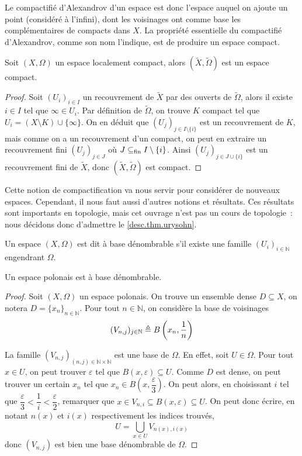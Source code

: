 Le compactifié d'Alexandrov d'un espace est donc l'espace auquel on ajoute un
point (considéré à l'infini), dont les voisinages ont comme base les
complémentaires de compacts dans $X$. La propriété essentielle du compactifié
d'Alexandrov, comme son nom l'indique, est de produire un espace compact.

\begin{proposition}
  Soit $(X,\Omega)$ un espace localement compact, alors
  $(\tilde X,\tilde\Omega)$ est un espace compact.
\end{proposition}

\begin{proof}
  Soit $(U_i)_{i\in I}$ un recouvrement de $\tilde X$ par des ouverts de
  $\tilde\Omega$, alors il existe $i\in I$ tel que $\infty \in U_i$. Par
  définition de $\tilde \Omega$, on trouve $K$ compact tel que
  $U_i = (X\setminus K)\cup\{\infty\}$. On en déduit que
  $(U_j)_{j\in I\setminus\{i\}}$ est un recouvrement de $K$, mais comme
  on a un recouvrement d'un compact, on peut en extraire un recouvrement
  fini $(U_j)_{j\in J}$ où $J\subseteq_{\mathrm{fin}} I\setminus\{i\}$. Ainsi
  $(U_j)_{j\in J\cup \{i\}}$ est un recouvrement fini de $\tilde X$, donc
  $(\tilde X,\tilde\Omega)$ est compact.
\end{proof}

Cette notion de compactification va nous servir pour considérer de nouveaux
espaces. Cependant, il nous faut aussi d'autres notions et résultats. Ces
résultats sont importants en topologie, mais cet ouvrage n'est pas un cours de
topologie~: nous décidons donc d'admettre le \cref{desc.thm.urysohn}.

\begin{definition}
  Un espace $(X,\Omega)$ est dit à base dénombrable s'il existe une famille
  $(U_i)_{i\in\mathbb N}$ engendrant $\Omega$.
\end{definition}

\begin{proposition}\label{prop.base.denomb}
  Un espace polonais est à base dénombrable.
\end{proposition}

\begin{proof}
  Soit $(X,\Omega)$ un espace polonais. On trouve un ensemble dense
  $D\subseteq X$, on notera $D = \{x_n\}_{n\in\mathbb N}$. Pour tout
  $n\in\mathbb N$, on considère la base de voisinages
  \[(V_{n,j})_{j\in \mathbb N} \triangleq B\left(x_n,\frac{1}{n}\right)\]

  La famille $(V_{n,j})_{(n,j)\in\mathbb N\times\mathbb N}$ est une base de $\Omega$.
  En effet, soit $U\in\Omega$. Pour tout $x\in U$, on peut trouver
  $\varepsilon$ tel que $B(x,\varepsilon)\subseteq U$. Comme $D$ est dense,
  on peut trouver un certain $x_n$ tel que
  $x_n \in B\left(x,\dfrac{\varepsilon}{3}\right)$. On peut alors, en
  choisissant $i$ tel que
  $\dfrac{\varepsilon}{3} < \dfrac{1}{i} < \dfrac{\varepsilon}{2}$, remarquer
  que $x\in V_{n,i}\subseteq B(x,\varepsilon)\subseteq U$. On peut donc écrire,
  en notant $n(x)$ et $i(x)$ respectivement les indices trouvés,
  \[U = \bigcup_{x\in U} V_{n(x),i(x)}\]
  donc $(V_{n,j})$ est bien une base dénombrable de $\Omega$.
\end{proof}

